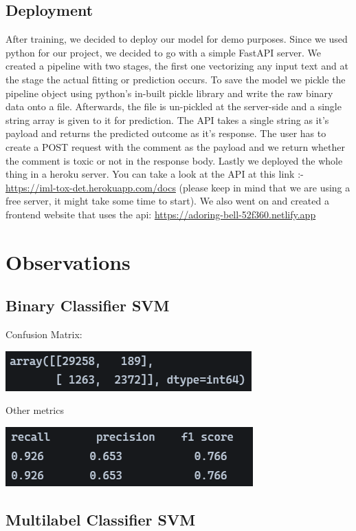 \documentclass[11pt]{article}
\begin{document}
\subsection*{Deployment}
After training, we decided to deploy our model for demo purposes. 
Since we used python for our project, we decided to go with a simple FastAPI server.
We created a pipeline with two stages, the first one vectorizing any
input text and at the stage the actual fitting or prediction occurs. 
To save the model we pickle the pipeline object using python's in-built 
pickle library and write the raw binary data onto a file. 
Afterwards, the file is un-pickled at the server-side and a single string 
array is given to it for prediction. 
The API takes a single string as it's payload and returns the predicted outcome 
as it's response. The user has to create a POST request with the comment as the 
payload and we return whether the comment is toxic or not in the response body.
Lastly we deployed the whole thing in a heroku server.
You can take a look at the API at this link 
:- \url{https://iml-tox-det.herokuapp.com/docs}
(please keep in mind that we are using a free server, it might take some time to start). 
We also went on and created a frontend website that uses the api: 
\url{https://adoring-bell-52f360.netlify.app}
\section{Observations}
\subsection{Binary Classifier SVM}
Confusion Matrix:
\begin{center}
	\includegraphics[scale=0.75]{figs/conf_bSVM.png}
\end{center}
Other metrics
\begin{center}
	\includegraphics[scale=0.75]{figs/rpf_bSVM.png}	
\end{center}


\subsection{Multilabel Classifier SVM}
\end{document}
